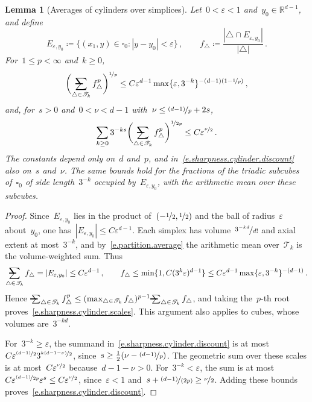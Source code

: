 \documentclass[11pt,letterpaper]{article}
\makeatletter
\numberwithin{equation}{section}
\newtheorem{lemma}[theorem]{Lemma}
\theoremstyle{definition}
\newcommand{\R}{\mathbb{R}}
\newcommand{\eps}{\varepsilon}
\newcommand{\nf}{\nicefrac}
\newcommand{\cu}{\square}
\newcommand{\avsum}{\mathop{\mathpalette\avsuminner\relax}\displaylimits}
\newcommand\avsuminner[2]{%
	{\sbox0{$\m@th#1\sum$}%
		\vphantom{\usebox0}%
		\ooalign{%
			\hidewidth
			\smash{\,\rule[.23em]{8.8pt}{1.1pt} \relax}%
			\hidewidth\cr
			$\m@th#1\sum$\cr
		}%
	}%
}
\makeatother
\begin{document}
\begin{lemma}[Averages of cylinders over simplices]
\label{l.sharpness.cylinder.averages}
Let~$0<\eps<1$ and~$y_0\in\R^{d-1}$, and define
\begin{equation*}
	E_{\eps,y_0}\coloneqq\{(x_1,y)\in\cu_0:|y-y_0|<\eps\}\,,\qquad f_\triangle\coloneqq\frac{|\triangle\cap E_{\eps,y_0}|}{|\triangle|}\,.
\end{equation*}
For~$1\leq p<\infty$ and~$k\geq0$,
\begin{equation}
	\biggl(\avsum_{\triangle\in\mathscr T_k}f_\triangle^p\biggr)^{\nf1p}\leq C\eps^{d-1}\max\{\eps,3^{-k}\}^{-(d-1)(1-\nf1p)}\,,
	\label{e.sharpness.cylinder.scales}
\end{equation}
and, for~$s>0$ and~$0<\nu<d-1$ with~$\nu\leq\nf{(d-1)}p+2s$,
\begin{equation}
	\sum_{k\geq0}3^{-ks}\biggl(\avsum_{\triangle\in\mathscr T_k}f_\triangle^p\biggr)^{\nf1{2p}}\leq C\eps^{\nf\nu2}\,.
	\label{e.sharpness.cylinder.discount}
\end{equation}
The constants depend only on~$d$ and~$p$, and in~\eqref{e.sharpness.cylinder.discount} also on~$s$ and~$\nu$. The same bounds hold for the fractions of the triadic subcubes of~$\cu_0$ of side length~$3^{-k}$ occupied by~$E_{\eps,y_0}$, with the arithmetic mean over these subcubes.
\end{lemma}

\begin{proof}
Since~$E_{\eps,y_0}$ lies in the product of~$(-\nf12,\nf12)$ and the ball of radius~$\eps$ about~$y_0$, one has~$|E_{\eps,y_0}|\leq C\eps^{d-1}$. Each simplex has volume~$\nf{3^{-kd}}{d!}$ and axial extent at most~$3^{-k}$, and by~\eqref{e.partition.average} the arithmetic mean over~$\mathscr T_k$ is the volume-weighted sum. Thus
\begin{equation*}
	\avsum_{\triangle\in\mathscr T_k}f_\triangle=|E_{\eps,y_0}|\leq C\eps^{d-1}\,,\qquad f_\triangle\leq\min\{1,C(3^k\eps)^{d-1}\}\leq C\eps^{d-1}\max\{\eps,3^{-k}\}^{-(d-1)}\,.
\end{equation*}
Hence~$\avsum_{\triangle\in\mathscr T_k}f_\triangle^p\leq(\max_{\triangle\in\mathscr T_k}f_\triangle)^{p-1}\avsum_{\triangle\in\mathscr T_k}f_\triangle$, and taking the~$p$-th root proves~\eqref{e.sharpness.cylinder.scales}. This argument also applies to cubes, whose volumes are~$3^{-kd}$.

\smallskip
For~$3^{-k}\geq\eps$, the summand in~\eqref{e.sharpness.cylinder.discount} is at most~$C\eps^{\nf{(d-1)}2}3^{\nf{k(d-1-\nu)}2}$, since~$s\geq\frac12(\nu-\nf{(d-1)}p)$. The geometric sum over these scales is at most~$C\eps^{\nf\nu2}$ because~$d-1-\nu>0$. For~$3^{-k}<\eps$, the sum is at most~$C\eps^{\nf{(d-1)}{2p}}\eps^s\leq C\eps^{\nf\nu2}$, since~$\eps<1$ and~$s+\nf{(d-1)}{(2p)}\geq\nf\nu2$. Adding these bounds proves~\eqref{e.sharpness.cylinder.discount}.
\end{proof}
\end{document}
